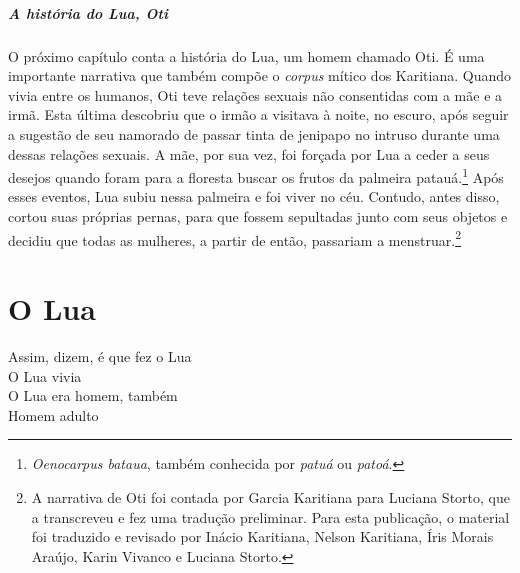 \vspace*{\fill}
\paragraph{A história do Lua, Oti} O próximo capítulo conta a história do Lua, um homem chamado Oti. É uma importante narrativa que também compõe o \textit{corpus} mítico dos Karitiana. Quando vivia entre
os humanos, Oti teve relações sexuais não consentidas com a mãe e a
irmã. Esta última descobriu que o irmão a visitava à noite, no escuro,
após seguir a sugestão de seu namorado de passar tinta de jenipapo no
intruso durante uma dessas relações sexuais. A mãe, por sua vez, foi
forçada por Lua a ceder a seus desejos quando foram para a floresta
buscar os frutos da palmeira patauá.\footnote{\textit{Oenocarpus bataua}, também 
conhecida por \textit{patuá} ou \textit{patoá}.} Após esses eventos, Lua subiu
nessa palmeira e foi viver no céu. Contudo, antes disso, cortou suas
próprias pernas, para que fossem sepultadas junto com seus objetos e
decidiu que todas as mulheres, a partir de então, passariam a menstruar.\footnote{A narrativa de Oti foi contada por Garcia Karitiana para Luciana Storto,
que a transcreveu e fez uma tradução preliminar. Para esta publicação, o
material foi traduzido e revisado por Inácio Karitiana, Nelson
Karitiana, Íris Morais Araújo, Karin Vivanco e Luciana Storto.}
\vspace*{\fill}


\chapter{O Lua}

\begin{linenumbers}\begingroup\raggedright
\noindent Assim, dizem, é que fez o Lua\\
O Lua vivia\\
O Lua era homem, também\\
Homem adulto
\end{linenumbers}\endgroup

\bigskip

